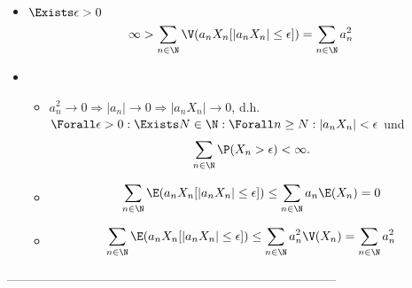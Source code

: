 \begin{solution}
\begin{itemize}
\end{itemize}

\begin{itemize}

  \item[\Quote{$\Rightarrow$}] $\Exists \epsilon > 0$
  \begin{align*}
    \infty
    >
    \sum_{n \in \N} \V(a_n X_n [|a_n X_n| \leq \epsilon])
    =
    \sum_{n \in \N} a_n^2
  \end{align*}

  \item[\Quote{$\Leftarrow$}]
  \begin{itemize}

    \item $a_n^2 \to 0
    \Rightarrow
    |a_n| \to 0
    \Rightarrow
    |a_n X_n| \to 0$,
    d.h. $\Forall \epsilon > 0: \Exists N \in \N: \Forall n \geq N: |a_n X_n| < \epsilon$ und
    \begin{align*}
      \sum_{n \in \N} \P(X_n > \epsilon) < \infty.
    \end{align*}

    \item
    \begin{align*}
      \sum_{n \in \N} \E(a_n X_n [|a_n X_n| \leq \epsilon])
      \leq
      \sum_{n \in \N} a_n \E(X_n) = 0
    \end{align*}

    \item
    \begin{align*}
      \sum_{n \in \N} \E(a_n X_n [|a_n X_n| \leq \epsilon])
      \leq
      \sum_{n \in \N} a_n^2 \V(X_n)
      =
      \sum_{n \in \N} a_n^2
    \end{align*}

  \end{itemize}

\end{itemize}

\end{solution}

--------------------------------------------------------------------------------
